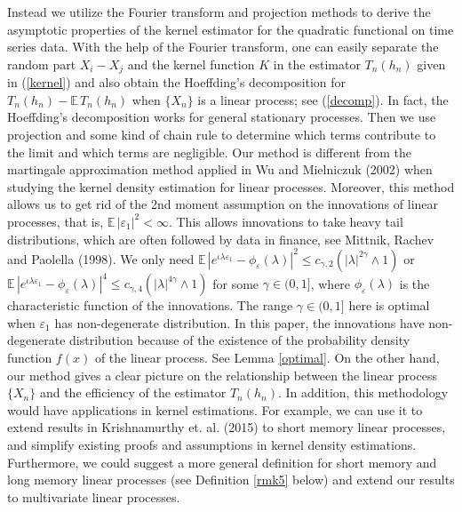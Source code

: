 \documentclass[11pt]{article}
\def\E{{{\mathbb E}\,}}
\begin{document}
Instead we utilize the Fourier transform and projection methods to derive the asymptotic properties of the kernel estimator for the quadratic functional on time series data. With the help of the Fourier transform,  one can easily separate the random part $X_i-X_j$ and the kernel function $K$ in the estimator $T_n(h_n)$ given in (\ref{kernel}) and also obtain the Hoeffding's decomposition for $T_n(h_n)-\E T_n(h_n)$ when $\{X_n\}$ is a linear process; see (\ref{decomp}).  In fact, the Hoeffding's decomposition works for general stationary processes.  Then we use projection and some kind of chain rule to determine which terms contribute to the limit and which terms are negligible. Our method is different from the martingale approximation method applied in Wu and Mielniczuk  (2002) when studying the kernel density estimation for linear processes. Moreover, this method allows us to get rid of the 2nd moment assumption on the innovations of linear processes, that is, $\E|\varepsilon_1|^2<\infty$.  This allows innovations to take heavy tail distributions, which are often followed by data in finance, see Mittnik, Rachev and Paolella (1998).  We only need $\E|e^{\iota\lambda\varepsilon_1}-\phi_{\varepsilon}(\lambda)|^2\leq c_{\gamma,2}(|\lambda|^{2\gamma}\wedge 1)$ or $\E|e^{\iota\lambda\varepsilon_1}-\phi_{\varepsilon}(\lambda)|^4\leq c_{\gamma,4}(|\lambda|^{4\gamma}\wedge 1)$ for some $\gamma\in(0,1]$, where $\phi_{\varepsilon}(\lambda)$ is the characteristic function of the innovations. The range $\gamma\in(0,1]$ here is optimal when $\varepsilon_1$ has non-degenerate distribution. In this paper, the innovations have non-degenerate distribution because of the existence of the probability density function $f(x)$ of the linear process. See Lemma \ref{optimal}. On the other hand, our method gives a clear picture on the relationship between the linear process $\{X_n\}$ and the efficiency of the estimator $T_n(h_n)$. In addition, this methodology would have applications in kernel estimations. For example, we can use it to extend results in Krishnamurthy et. al. (2015) to short memory linear processes, and simplify existing proofs and assumptions in kernel density estimations. Furthermore, we could suggest a more general definition for short memory and long memory linear processes (see Definition \ref{rmk5} below) and extend our results to multivariate linear processes.
\end{document}
